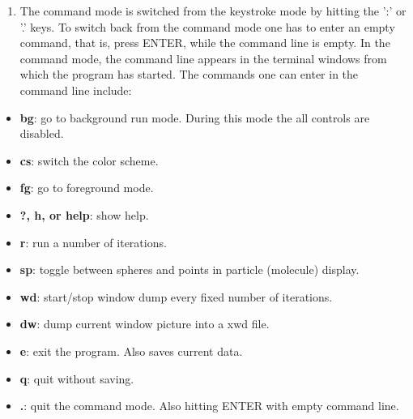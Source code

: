 \begin{enumerate}
\item The command mode is switched from the keystroke mode by hitting the ':' or '.' keys. To switch back from the command mode one has to enter an empty command, that is, press ENTER, while the command line is empty. In the command mode, the command line appears in the terminal windows from which the program has started. The commands one can enter in the command line include:\end{enumerate}


\begin{itemize}
\item {\bf bg}: go to background run mode. During this mode the all controls are disabled.\item {\bf cs}: switch the color scheme.\item {\bf fg}: go to foreground mode.\item {\bf ?, h, or help}: show help.\item {\bf r}: run a number of iterations.\item {\bf sp}: toggle between spheres and points in particle (molecule) display.\item {\bf wd}: start/stop window dump every fixed number of iterations.\item {\bf dw}: dump current window picture into a xwd file.\item {\bf e}: exit the program. Also saves current data.\item {\bf q}: quit without saving.\item {\bf .}: quit the command mode. Also hitting ENTER with empty command line. \end{itemize}
